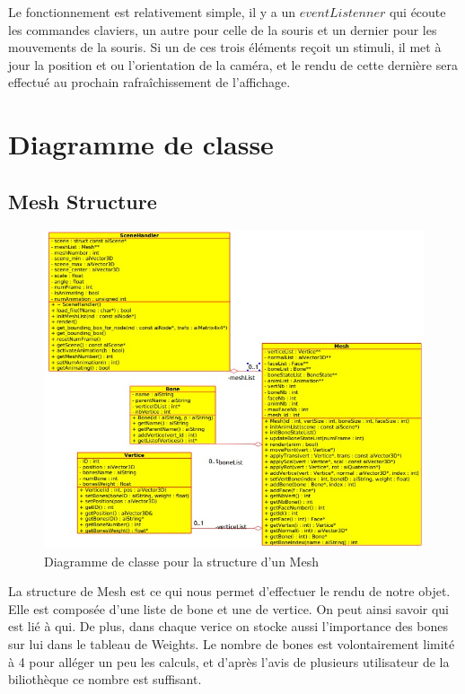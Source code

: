 \documentclass[a4paper]{report}
\begin{document}
Le fonctionnement est relativement simple, il y a un $eventListenner$ qui écoute les commandes claviers, un autre pour celle de la souris et un dernier pour les mouvements de la souris. Si un de ces trois éléments reçoit un stimuli, il met à jour la position et ou l'orientation de la caméra, et le rendu de cette dernière sera effectué au prochain rafraîchissement de l'affichage. 

\newpage
\chapter{Diagramme de classe}
\section{Mesh Structure}
\begin{figure}[H]
    \begin{center}
        \includegraphics[width=1\textwidth]{MeshStructure.jpg}
        \caption{Diagramme de classe pour la structure d'un Mesh}
    \end{center}
\end{figure}
    La structure de Mesh est ce qui nous permet d'effectuer le rendu de notre objet. Elle est composée d'une liste de bone et une de vertice. On peut ainsi savoir qui est lié à qui. De plus, dans chaque verice on stocke aussi l'importance des bones sur lui dans le tableau de Weights. Le nombre de bones est volontairement limité à 4 pour alléger un peu les calculs, et d'après l'avis de plusieurs utilisateur de la biliothèque ce nombre est suffisant. 
\end{document}
